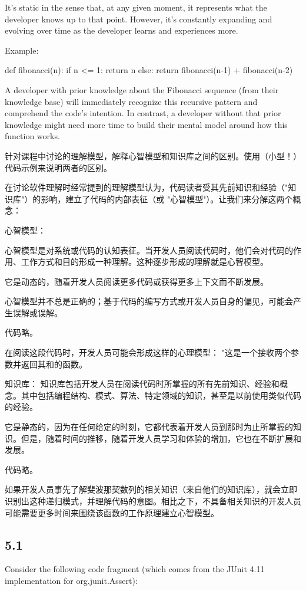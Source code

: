 It's static in the sense that, at any given moment, it represents what the developer knows up to that point. However, it's constantly expanding and evolving over time as the developer learns and experiences more.

Example:

def fibonacci(n):
if n <= 1:
return n
else:
return fibonacci(n-1) + fibonacci(n-2)

A developer with prior knowledge about the Fibonacci sequence (from their knowledge base) will immediately recognize this recursive pattern and comprehend the code's intention. In contrast, a developer without that prior knowledge might need more time to build their mental model around how this function works.

针对课程中讨论的理解模型，解释心智模型和知识库之间的区别。使用（小型！）代码示例来说明两者的区别。

在讨论软件理解时经常提到的理解模型认为，代码读者受其先前知识和经验（"知识库"）的影响，建立了代码的内部表征（或 "心智模型"）。让我们来分解这两个概念：

心智模型：

心智模型是对系统或代码的认知表征。当开发人员阅读代码时，他们会对代码的作用、工作方式和目的形成一种理解。这种逐步形成的理解就是心智模型。

它是动态的，随着开发人员阅读更多代码或获得更多上下文而不断发展。

心智模型并不总是正确的；基于代码的编写方式或开发人员自身的偏见，可能会产生误解或误解。

代码略。

在阅读这段代码时，开发人员可能会形成这样的心理模型： "这是一个接收两个参数并返回其和的函数。

知识库：
知识库包括开发人员在阅读代码时所掌握的所有先前知识、经验和概念。其中包括编程结构、模式、算法、特定领域的知识，甚至是以前使用类似代码的经验。

它是静态的，因为在任何给定的时刻，它都代表着开发人员到那时为止所掌握的知识。但是，随着时间的推移，随着开发人员学习和体验的增加，它也在不断扩展和发展。

代码略。

如果开发人员事先了解斐波那契数列的相关知识（来自他们的知识库），就会立即识别出这种递归模式，并理解代码的意图。相比之下，不具备相关知识的开发人员可能需要更多时间来围绕该函数的工作原理建立心智模型。

\subsection{5.1}
Consider the following code fragment (which comes from the JUnit 4.11 implementation for org.junit.Assert):

